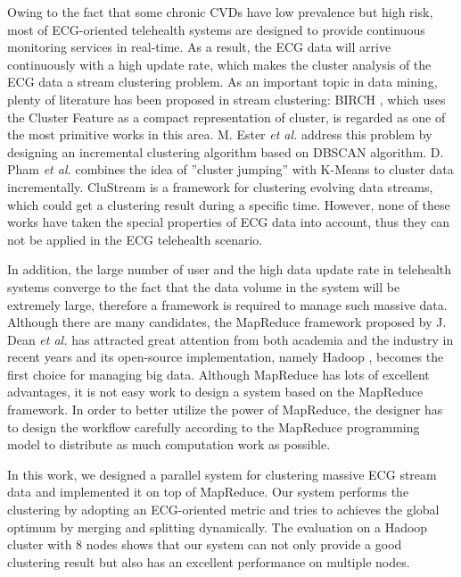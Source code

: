 \documentclass[conference]{IEEEtran}
\begin{document}
Owing to the fact that some chronic CVDs have low prevalence but high risk, most of ECG-oriented telehealth systems are designed to provide continuous monitoring services in real-time. As a result, the ECG data will arrive continuously with a high update rate, which makes the cluster analysis of the ECG data a stream clustering problem. As an important topic in data mining, plenty of literature has been proposed in stream clustering: BIRCH \cite{Zhang:1996:BED:235968.233324}, which uses the Cluster Feature as a compact representation of cluster, is regarded as one of the most primitive works in this area. M. Ester \textit{et al.} \cite{Ester:1998:ICM:645924.671201} address this problem by designing an incremental clustering algorithm based on DBSCAN algorithm. D. Pham \textit{et al.} \cite{pham2004incremental} combines the idea of ''cluster jumping'' with K-Means to cluster data incrementally. CluStream \cite{aggarwal2003framework} is a framework for clustering evolving data streams, which could get a clustering result during a specific time. However, none of these works have taken the special properties of ECG data into account, thus they can not be applied in the ECG telehealth scenario. 


In addition, the large number of user and the high data update rate in telehealth systems converge to the fact that the data volume in the system will be extremely large, therefore a framework is required to manage such massive data. Although there are many candidates, the MapReduce framework  proposed by J. Dean \textit{et al.} \cite{dean2008mapreduce} has attracted great attention from both academia and the industry in recent years and its open-source implementation, namely Hadoop \cite{white2010hadoop}, becomes the first choice for managing big data. Although MapReduce has lots of excellent advantages, it is not easy work to design a system based on the MapReduce framework. In order to better utilize the power of MapReduce, the designer has to design the workflow carefully according to the MapReduce programming model to distribute as much computation work as possible.


In this work, we designed a parallel system for clustering massive ECG stream data and implemented it on top of MapReduce. Our system performs the clustering by adopting an ECG-oriented metric and tries to achieves the global optimum by merging and splitting dynamically. The evaluation on a Hadoop cluster with 8 nodes shows that our system can not only provide a good clustering result but also has an excellent performance on multiple nodes.
\end{document}
